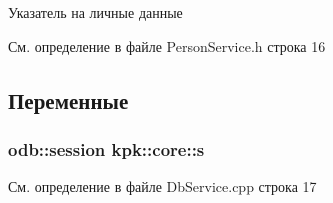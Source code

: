 Указатель на личные данные 



См. определение в файле Person\+Service.\+h строка 16



\subsection{Переменные}
\subsubsection[{\texorpdfstring{s}{s}}]{\setlength{\rightskip}{0pt plus 5cm}odb\+::session kpk\+::core\+::s}\hypertarget{namespacekpk_1_1core_a4f9bed5f4644496878e2126c1c8e6412}{}\label{namespacekpk_1_1core_a4f9bed5f4644496878e2126c1c8e6412}


См. определение в файле Db\+Service.\+cpp строка 17

